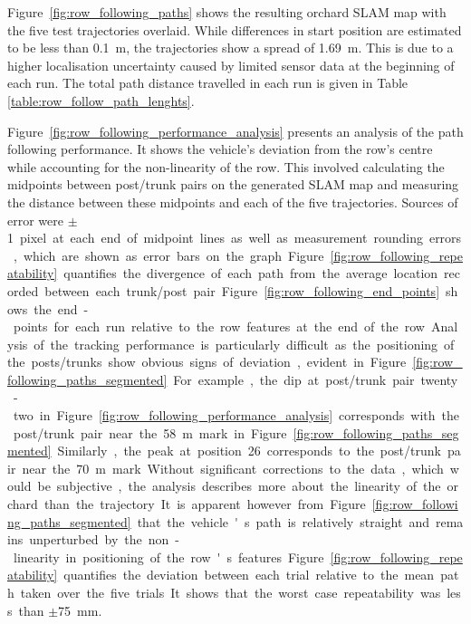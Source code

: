 \documentclass[preprint,authoryear,12pt]{elsarticle}
\begin{document}
    Figure~\ref{fig:row_following_paths} shows the resulting orchard SLAM map with the five test trajectories overlaid.
    While differences in start position are estimated to be less than \SI{0.1}{\meter}, the trajectories show a spread of \SI{1.69}{\meter}.
    This is due to a higher localisation uncertainty caused by limited sensor data at the beginning of each run.
    The total path distance travelled in each run is given in Table \ref{table:row_follow_path_lenghts}.

    Figure~\ref{fig:row_following_performance_analysis} presents an analysis of the path following performance.
    It shows the vehicle's deviation from the row's centre while accounting for the non-linearity of the row.
    This involved calculating the midpoints between post/trunk pairs on the generated SLAM map and measuring the distance between these midpoints and each of the five trajectories.
    Sources of error were $\pm$\SI{1} pixel at each end of midpoint lines as well as measurement rounding errors, which are shown as error bars on the graph.

    Figure~\ref{fig:row_following_repeatability} quantifies the divergence of each path from the average location recorded between each trunk/post pair.
    Figure~\ref{fig:row_following_end_points} shows the end-points for each run relative to the row features at the end of the row.

    Analysis of the tracking performance is particularly difficult as the positioning of the posts/trunks show obvious signs of deviation, evident in Figure~\ref{fig:row_following_paths_segmented}.
    For example, the dip at post/trunk pair twenty-two in Figure~\ref{fig:row_following_performance_analysis} corresponds with the post/trunk pair near the \SI{58}{\meter} mark in Figure~\ref{fig:row_following_paths_segmented}.
    Similarly, the peak at position 26 corresponds to the post/trunk pair near the \SI{70}{\meter} mark.
    Without significant corrections to the data, which would be subjective, the analysis describes more about the linearity of the orchard than the trajectory.
    It is apparent however from Figure~\ref{fig:row_following_paths_segmented} that the vehicle's path is relatively straight and remains unperturbed by the non-linearity in positioning of the row's features.

    Figure~\ref{fig:row_following_repeatability} quantifies the deviation between each trial relative to the mean path taken over the five trials.
    It shows that the worst case repeatability was less than $\pm$\SI{75}{\milli\meter}.
\end{document}
